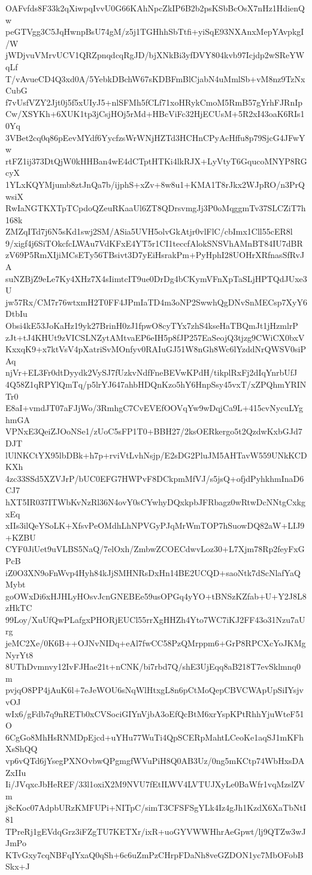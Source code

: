 OAFvfds8F33k2qXiwpqIvvU0G66KAhNpcZkIP6B2b2psKSbBcOsX7nHz1HdienQw
peGTVgg3C5JqHwnpBsU74gM/z5j1TGHhhSbTtfi+yiSqE93NXAnxMepYAvpkgI/W
jWDjvuVMrvUCV1QRZpnqdcqRgJD/bjXNkBi3yfDVY804kvb97Icjdp2wSReYWqLf
T/vAvueCD4Q3xd0A/5YebkDBchW67sKDBFmBlCjabN4uMmlSb+vM8nz9TzNxCubG
f7vUsfVZY2Jjt0j5f5xUIyJ5+nlSFMh5fCLf71xoHRykCmoM5RmB57gYrhFJRnIp
Cw/XSYKh+6XUK1tp3jCsjHOj5rMd+HBcViFc32HjECUsM+5R2xI43oaK6RIs10Yq
3VBet2cq0q86pEevMYdf6YycfzsWrWNjHZTd3HCHnCPyAcHffu8p79SjcG4JFwYw
rtFZ1ij373DtQjW0kHHBan4wE4dCTptHTKi4lkRJX+LyVtyT6GqucoMNYP8RGcyX
1YLxKQYMjumb8ztJnQa7b/ijphS+xZv+8w8u1+KMA1T8rJkx2WJpRO/n3PrQwsiX
RwIaNGTKXTpTCpdoQZeuRKaaUl6ZT8QDrsvmgJj3P0oMqggmTv37SLCZiT7h168k
ZMZqITd7j6N5sKd1swj2SM/ASia5UVH5olvGkAtjr0vlFlC/cbImx1Cll55cER8l
9/xigf4j6SiTOkcfcLWAu7VdKFxE4YT5r1CI1teccfAlokSNSVhAMnBT84IU7dBR
zV69P5RmXIjiMCsETy56TBsivt3D7yEiHsrakPm+PyHphI28UOHrXRfnasSfRvJA
suNZBjZ9eLe7Ky4XHz7X4sIimtcIT9ue0DrDg4bCKymVFnXpTaSLjHPTQdJUxe3U
jw57Rx/CM7r76wtxmH2T0FF4JPmIaTD4m3oNP2SwwhQgDNvSnMECsp7XyY6DtbIu
Obsi4kE53JoKaHz19yk27BrinH0zJ1fpwO8cyTYx7zhS4kseHaTBQmJt1jHzmlrP
zJt+tJ4KHUt9zVICSLNZytAMtvaEP6eIH5p8fJP257EaSeojQ3tjzg9CWiCX0bxV
KxxqK9+x7ktVsV4pXatriSvMOnfyv0RAIuGJ51W8nGh8Wc6lYzddNrQWSV0siPAq
njVr+EL3Fr0dtDyydk2VySJ7fUzkvNdfFneBEVwKPdH/tikplRxFj2dIqYnrbUfJ
4Q58Z1qRPYlQmTq/p5lrYJ647ahbHDQnKzo5hY6HnpSsy45vxT/xZPQhmYRINTr0
E8aI+vmdJT07aFJjWo/3RmhgC7CvEVEfOOVqYw9wDqjCa9L+415cvNycuLYghmGA
VPNxE3QeiZJOoNSe1/zUoC5sFP1T0+BBH27/2ksOERkergo5t2QzdwKxbGJd7DJT
lUlNKCtYX95lbDBk+h7p+rviVtLvhNsjp/E2sDG2PluJM5AHTavW559UNkKCDKXh
4zc33SSd5XZVJrP/bUC0EFG7HWPvF8DCkpmMfVJ/s5jsQ+ofjdPyhkhmInaD6CJ7
hXT5IR037ITWbKvNzRl36N4ovY0sCYwhyDQxkpbJFRbagz0wRtwDcNNtgCxkgxEq
xIIs3ilQeYSoLK+XfsvPeOMdhLhNPVGyPJqMrWmTOP7hSuowDQ82aW+LIJ9+KZBU
CYF0JiUet9uVLBS5NaQ/7elOxh/ZmbwZCOECdwvLoz30+L7Xjm78Rp2feyFxGPcB
iZ0O3XN9oFnWvp4Hyh84kJjSMHNRsDxHn14BE2UCQD+saoNtk7dScNlafYaQMybt
goOWxDi6xHJHLyHOsvJcnGNEBEe59usOPGq4yYO+tBNSzKZfab+U+Y2J8L8zHkTC
99Loy/XuUfQwPLafgxPHORjEUCl55rrXgHHZh4Yto7WC7iKJ2FF43o31Nzu7aUrg
jeMC2Xe/0K6B++OJNvNIDq+eAl7fwCC58PzQMrppm6+GrP8RPCXcYoJKMgNyrYt8
8UThDvmnvy12IvFJHae21t+nCNK/bi7rbd7Q/shE3UjEqq8aB218T7evSklmnq0m
pvjqO8PP4jAuK6l+7eJeWOU6sNqWlHtxgL8n6pCtMoQepCBVCWApUpSiIYsjvvOJ
wIx6/gFdb7q9nRETb0xCVSociGIYnVjbA3oEfQcBtM6xrYspKPtRhhYjuWteF51O
6CgGo8MhHsRNMDpEjcd+uYHu77WuTi4QpSCERpMahtLCeoKe1aqSJ1mKFhXsShQQ
vp6vQTd6jYsegPXNOvbwQPgmgfWVuPiH8Q0AB3Uz/0ng5mKCtp74WbHxsDAZxIIu
Ii/JVqxcJbHeREF/33l1oxiX2M9NVU7fEtILWV4LVTUJXyLe0BaWfr1vqMzslZVm
j8cKoc07AdpbURzKMFUPi+NITpC/simT3CFSFSgYLk4Iz4gJh1KzdX6XaTbNtI81
TPreRj1gEVdqGrz3iFZgTU7KETXr/ixR+uoGYVWWHhrAeGpwt/lj9QTZw3wJJmPo
KTvGxy7cqNBFqIYxaQ0qSh+6c6uZmPzCHrpFDaNh8veGZDON1yc7MbOFobBSkx+J
